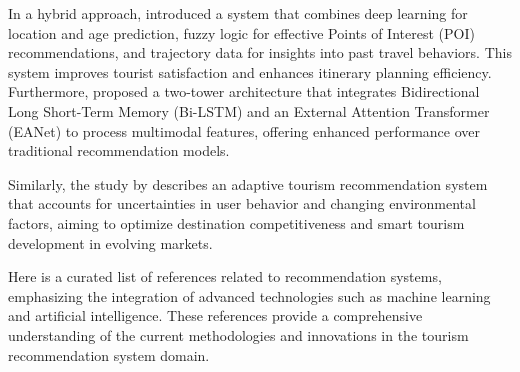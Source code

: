 In a hybrid approach, \cite{intissar2024touroptiguide} introduced a system that combines deep learning for location and age prediction, fuzzy logic for effective Points of Interest (POI) recommendations, and trajectory data for insights into past travel behaviors. This system improves tourist satisfaction and enhances itinerary planning efficiency. Furthermore, \cite{cui2024multimodal} proposed a two-tower architecture that integrates Bidirectional Long Short-Term Memory (Bi-LSTM) and an External Attention Transformer (EANet) to process multimodal features, offering enhanced performance over traditional recommendation models.

Similarly, the study by \cite{yuan2024your} describes an adaptive tourism recommendation system that accounts for uncertainties in user behavior and changing environmental factors, aiming to optimize destination competitiveness and smart tourism development in evolving markets.

Here is a curated list of references related to recommendation systems, emphasizing the integration of advanced technologies such as machine learning and artificial intelligence. These references provide a comprehensive understanding of the current methodologies and innovations in the tourism recommendation system domain.

